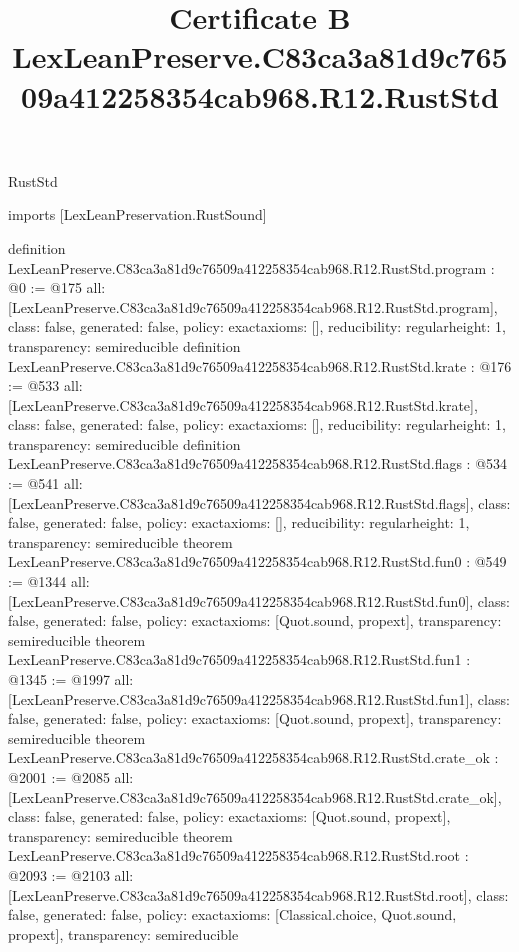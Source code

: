 \begin{lexlean}{RustStd}
\title{Certificate B LexLeanPreserve.C83ca3a81d9c76509a412258354cab968.R12.RustStd}
\begin{coremodule}
imports [LexLeanPreservation.RustSound]

definition LexLeanPreserve.C83ca3a81d9c76509a412258354cab968.R12.RustStd.program : @0 := @175 {
  all: [LexLeanPreserve.C83ca3a81d9c76509a412258354cab968.R12.RustStd.program],
  class: false,
  generated: false,
  policy: exact{axioms: []},
  reducibility: regular{height: 1},
  transparency: semireducible
}
definition LexLeanPreserve.C83ca3a81d9c76509a412258354cab968.R12.RustStd.krate : @176 := @533 {
  all: [LexLeanPreserve.C83ca3a81d9c76509a412258354cab968.R12.RustStd.krate],
  class: false,
  generated: false,
  policy: exact{axioms: []},
  reducibility: regular{height: 1},
  transparency: semireducible
}
definition LexLeanPreserve.C83ca3a81d9c76509a412258354cab968.R12.RustStd.flags : @534 := @541 {
  all: [LexLeanPreserve.C83ca3a81d9c76509a412258354cab968.R12.RustStd.flags],
  class: false,
  generated: false,
  policy: exact{axioms: []},
  reducibility: regular{height: 1},
  transparency: semireducible
}
theorem LexLeanPreserve.C83ca3a81d9c76509a412258354cab968.R12.RustStd.fun0 : @549 := @1344 {
  all: [LexLeanPreserve.C83ca3a81d9c76509a412258354cab968.R12.RustStd.fun0],
  class: false,
  generated: false,
  policy: exact{axioms: [Quot.sound, propext]},
  transparency: semireducible
}
theorem LexLeanPreserve.C83ca3a81d9c76509a412258354cab968.R12.RustStd.fun1 : @1345 := @1997 {
  all: [LexLeanPreserve.C83ca3a81d9c76509a412258354cab968.R12.RustStd.fun1],
  class: false,
  generated: false,
  policy: exact{axioms: [Quot.sound, propext]},
  transparency: semireducible
}
theorem LexLeanPreserve.C83ca3a81d9c76509a412258354cab968.R12.RustStd.crate_ok : @2001 := @2085 {
  all: [LexLeanPreserve.C83ca3a81d9c76509a412258354cab968.R12.RustStd.crate_ok],
  class: false,
  generated: false,
  policy: exact{axioms: [Quot.sound, propext]},
  transparency: semireducible
}
theorem LexLeanPreserve.C83ca3a81d9c76509a412258354cab968.R12.RustStd.root : @2093 := @2103 {
  all: [LexLeanPreserve.C83ca3a81d9c76509a412258354cab968.R12.RustStd.root],
  class: false,
  generated: false,
  policy: exact{axioms: [Classical.choice, Quot.sound, propext]},
  transparency: semireducible
}


\end{coremodule}
\end{lexlean}
